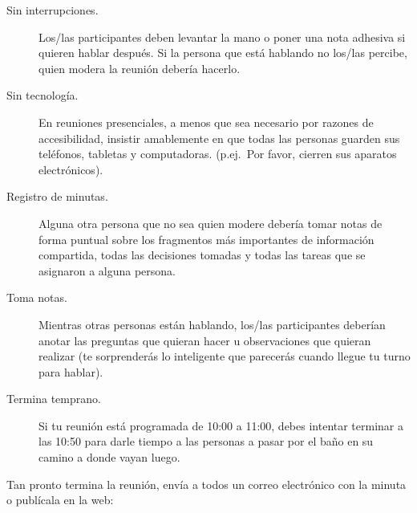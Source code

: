 \begin{description}
\item[Sin interrupciones.]
  Los/las participantes deben levantar la mano o poner una nota adhesiva
  si quieren hablar después.
  Si la persona que está hablando no los/las percibe,
  quien modera la reunión debería hacerlo.

\item[Sin tecnología.]
  En reuniones presenciales,
  a menos que sea necesario por razones de accesibilidad,
  insistir amablemente en que todas las personas
  guarden sus teléfonos, tabletas y computadoras.
  (p.ej.\ Por favor, cierren sus aparatos electrónicos).

\item[Registro de minutas.]
  Alguna otra persona que no sea quien modere 
  debería tomar notas de forma puntual sobre 
  los fragmentos más importantes de información compartida,
  todas las decisiones tomadas
  y todas las tareas que se asignaron a alguna persona.

\item[Toma notas.]
  Mientras otras personas están hablando,
  los/las participantes deberían anotar las preguntas 
  que quieran hacer u observaciones que quieran realizar
  (te sorprenderás lo inteligente que parecerás 
  cuando llegue tu turno para hablar).

\item[Termina temprano.]
  Si tu reunión está programada de 10:00 a 11:00,
  debes intentar terminar a las 10:50 para darle tiempo 
  a las personas a pasar por el baño 
  en su camino a donde vayan luego.

\end{description}

Tan pronto termina la reunión,
envía a todos un correo electrónico con la minuta o publícala en la web:

